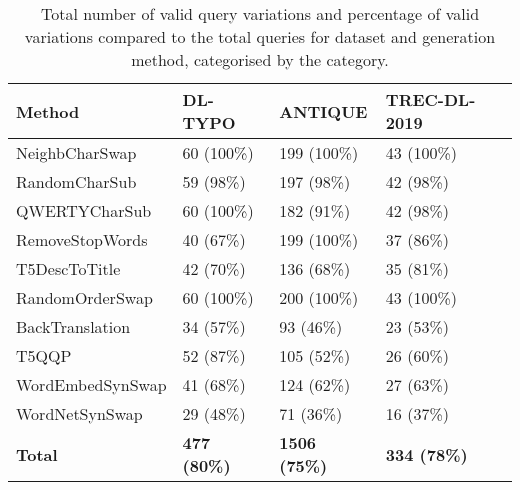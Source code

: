 \begin{table}[ht]
\centering
\caption{Total number of valid query variations and percentage of valid variations compared to the total queries for dataset and generation method, categorised by the category.}
\label{tab:valid-vars}
\begin{tabular}{l|l|l|l}
\textbf{Method}  & \textbf{DL-TYPO}    & \textbf{ANTIQUE}   & \textbf{TREC-DL-2019} \\ \hline
NeighbCharSwap   & 60 (100\%)          & 199 (100\%)        & 43 (100\%)            \\
RandomCharSub    & 59 (98\%)           & 197 (98\%)         & 42 (98\%)             \\
QWERTYCharSub    & 60 (100\%)          & 182 (91\%)         & 42 (98\%)             \\ \hline
RemoveStopWords  & 40 (67\%)           & 199 (100\%)        & 37 (86\%)             \\
T5DescToTitle    & 42 (70\%)           & 136 (68\%)         & 35 (81\%)             \\ \hline
RandomOrderSwap  & 60 (100\%)          & 200 (100\%)        & 43 (100\%)            \\ \hline
BackTranslation  & 34 (57\%)           & 93 (46\%)          & 23 (53\%)             \\
T5QQP            & 52 (87\%)           & 105 (52\%)         & 26 (60\%)             \\
WordEmbedSynSwap & 41 (68\%)           & 124 (62\%)         & 27 (63\%)             \\
WordNetSynSwap   & 29 (48\%)           & 71 (36\%)          & 16 (37\%)             \\ \hline
\textbf{Total}   & \textbf{477 (80\%)} & \textbf{1506 (75\%)} & \textbf{334 (78\%)}     \\ \hline
\end{tabular}%
\end{table}
